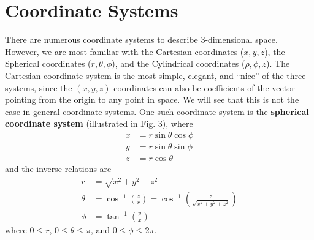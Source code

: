\documentclass{book}
\theoremstyle{definition}
\begin{document}
\section{Coordinate Systems}
There are numerous coordinate systems to describe 3-dimensional space. However, we are most familiar with the Cartesian coordinates ($x,y,z$), the Spherical coordinates ($r,\theta,\phi$), and the Cylindrical coordinates ($\rho, \phi, z$). The Cartesian coordinate system is the most simple, elegant, and ``nice'' of the three systems, since the $(x,y,z)$ coordinates can also be coefficients of the vector pointing from the origin to any point in space. We will see that this is not the case in general coordinate systems. One such coordinate system is the \textbf{spherical coordinate system} (illustrated in Fig. 3), where
\begin{align*}
x &= r\sin\theta\cos\phi\\
y &= r\sin\theta\sin\phi\\
z &= r\cos\theta
\end{align*}
and the inverse relations are
\begin{align*}
r &= \sqrt{x^2+y^2+z^2}\\
\theta &= \cos^{-1}\left( \frac{z}{r}\right) = \cos^{-1}\left( \frac{z}{\sqrt{x^2+y^2+z^2}}\right) \\
\phi &= \tan^{-1}\left( \frac{y}{x} \right) 
\end{align*}
where $0 \leq r$, $0 \leq \theta \leq \pi$, and $0 \leq \phi \leq 2\pi$.
\end{document}
